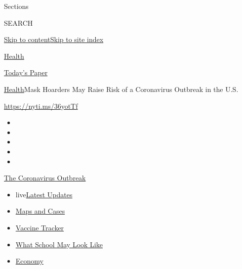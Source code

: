Sections

SEARCH

\protect\hyperlink{site-content}{Skip to
content}\protect\hyperlink{site-index}{Skip to site index}

\href{https://www.nytimes3xbfgragh.onion/section/health}{Health}

\href{https://myaccount.nytimes3xbfgragh.onion/auth/login?response_type=cookie\&client_id=vi}{}

\href{https://www.nytimes3xbfgragh.onion/section/todayspaper}{Today's
Paper}

\href{/section/health}{Health}\textbar{}Mask Hoarders May Raise Risk of
a Coronavirus Outbreak in the U.S.

\url{https://nyti.ms/36yotTf}

\begin{itemize}
\item
\item
\item
\item
\item
\end{itemize}

\href{https://www.nytimes3xbfgragh.onion/news-event/coronavirus?action=click\&pgtype=Article\&state=default\&region=TOP_BANNER\&context=storylines_menu}{The
Coronavirus Outbreak}

\begin{itemize}
\tightlist
\item
  live\href{https://www.nytimes3xbfgragh.onion/2020/08/01/world/coronavirus-covid-19.html?action=click\&pgtype=Article\&state=default\&region=TOP_BANNER\&context=storylines_menu}{Latest
  Updates}
\item
  \href{https://www.nytimes3xbfgragh.onion/interactive/2020/us/coronavirus-us-cases.html?action=click\&pgtype=Article\&state=default\&region=TOP_BANNER\&context=storylines_menu}{Maps
  and Cases}
\item
  \href{https://www.nytimes3xbfgragh.onion/interactive/2020/science/coronavirus-vaccine-tracker.html?action=click\&pgtype=Article\&state=default\&region=TOP_BANNER\&context=storylines_menu}{Vaccine
  Tracker}
\item
  \href{https://www.nytimes3xbfgragh.onion/interactive/2020/07/29/us/schools-reopening-coronavirus.html?action=click\&pgtype=Article\&state=default\&region=TOP_BANNER\&context=storylines_menu}{What
  School May Look Like}
\item
  \href{https://www.nytimes3xbfgragh.onion/live/2020/07/31/business/stock-market-today-coronavirus?action=click\&pgtype=Article\&state=default\&region=TOP_BANNER\&context=storylines_menu}{Economy}
\end{itemize}


